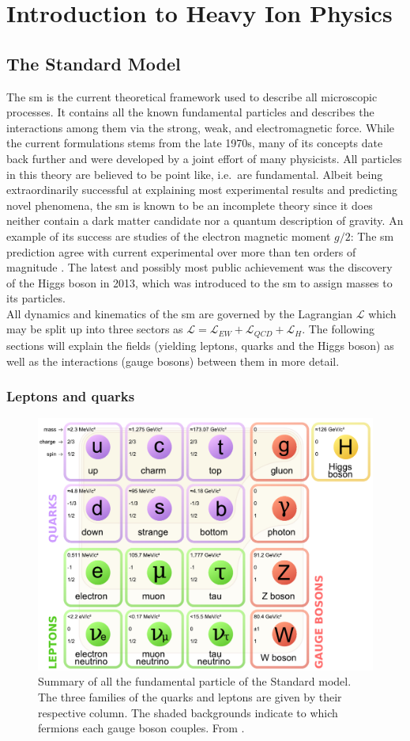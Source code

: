 \chapter{Introduction to Heavy Ion Physics}
\label{sec:concepts}
\section{The Standard Model}
\label{sec:sm}
The \gls{sm} is the current theoretical framework used to describe all microscopic processes. It contains all the known fundamental particles and describes the interactions among them via the strong, weak, and electromagnetic force. While the current formulations stems from the late 1970s, many of its concepts date back further and were developed by a joint effort of many physicists. All particles in this theory are believed to be point like, i.e.\ are fundamental. Albeit being extraordinarily successful at explaining most experimental results and predicting novel phenomena, the \gls{sm} is known to be an incomplete theory since it does neither contain a dark matter candidate nor a quantum description of gravity. An example of its success are studies of the electron magnetic moment $g/2$: The \gls{sm} prediction agree with current experimental over more than ten orders of magnitude \cite{Odom2006}. The latest and possibly most public achievement was the discovery of the Higgs boson in 2013, which was introduced to the \gls{sm} to assign masses to its particles.\\


All dynamics and kinematics of the \gls{sm} are governed by the Lagrangian $\mathcal{L}$ which may be split up into three sectors as $\mathcal{L} = \mathcal{L}_{EW} + \mathcal{L}_{QCD} + \mathcal{L}_{H}$. The following sections will explain the fields (yielding leptons, quarks and the Higgs boson) as well as the interactions (gauge bosons) between them in more detail.


\subsection{Leptons and quarks}
\label{sec:leptons-and-quarks}
\begin{figure}
  \centering
  \includegraphics[width=.6\textwidth]{figures/sm-particles.pdf}
  \caption[Summary of all the fundamental particle of the Standard model.]{Summary of all the fundamental particle of the Standard model. The three families of the quarks and leptons are given by their respective column. The shaded backgrounds indicate to which fermions each gauge boson couples. From \cite{Cush2014}.}
  \label{fig:sm}
\end{figure}

